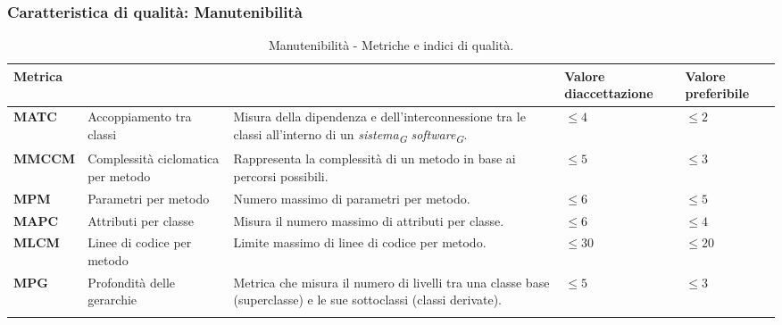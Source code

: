 \subsubsection{Caratteristica di qualità: Manutenibilità}
\begin{longtable}{|C{1.9cm}|L{4cm}|L{4cm}|L{2.2cm}|L{2.1cm}|}
    \hline
    \textbf{Metrica} &  &  & \textbf{Valore di\linebreak accettazione} & {\textbf{Valore \linebreak preferibile}} \\
    \hline \hline

    \textbf{MATC} & Accoppiamento tra classi & Misura della dipendenza e dell'interconnessione tra le classi all'interno di un \textit{sistema}\textsubscript{\textit{G}} \textit{software}\textsubscript{\textit{G}}. & $\leq 4$  & $\leq 2$ \\
    \hline

    \textbf{MMCCM} & Complessità ciclomatica per metodo & Rappresenta la complessità di un metodo in base ai percorsi possibili. & $\leq 5$ & $\leq 3$ \\
    \hline

    \textbf{MPM} & Parametri per metodo & Numero massimo di parametri per metodo. & $\leq 6$ & $\leq 5$ \\
    \hline

    \textbf{MAPC} & Attributi per classe & Misura il numero massimo di attributi per classe. & $\leq 6$ & $\leq 4$ \\
    \hline

     \textbf{MLCM} & Linee di codice per metodo & Limite massimo di linee di codice per metodo. & $\leq 30$ & $\leq 20$ \\
    \hline

    \textbf{MPG} & Profondità delle gerarchie & Metrica che misura il numero di livelli tra una classe base (superclasse) e le sue sottoclassi (classi derivate). & $\leq 5$  & $\leq 3$ \\
    \hline

    \caption{Manutenibilità - Metriche e indici di qualità.}
    \label{tab:metriche_manutenibilità_testo}
\end{longtable}

